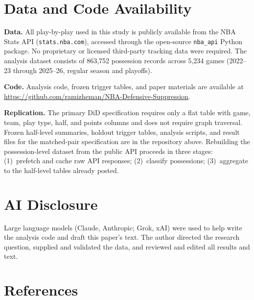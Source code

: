 \documentclass[11pt]{article}
\begin{document}
\section*{Data and Code Availability}
\label{sec:data-availability}

\textbf{Data.} All play-by-play used in this study is publicly available from the NBA Stats API (\texttt{stats.nba.com}), accessed through the open-source \texttt{nba\_api} Python package. No proprietary or licensed third-party tracking data were required. The analysis dataset consists of 863,752 possession records across 5,234 games (2022--23 through 2025--26, regular season and playoffs).

\textbf{Code.} Analysis code, frozen trigger tables, and paper materials are available at
\url{https://github.com/ramizheman/NBA-Defensive-Suppression}.

\textbf{Replication.} The primary DiD specification requires only a flat table with game, team, play type, half, and points columns and does not require graph traversal. Frozen half-level summaries, holdout trigger tables, analysis scripts, and result files for the matched-pair specification are in the repository above. Rebuilding the possession-level dataset from the public API proceeds in three stages: (1)~prefetch and cache raw API responses; (2)~classify possessions; (3)~aggregate to the half-level tables already posted.

\section*{AI Disclosure}

Large language models (Claude, Anthropic; Grok, xAI) were used to help write the
analysis code and draft this paper's text. The author directed the research
question, supplied and validated the data, and reviewed and edited all results
and text.

\section*{References}
\end{document}
